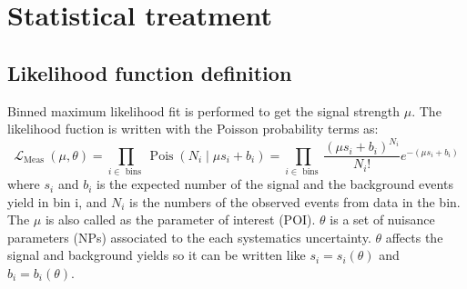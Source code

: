 \chapter{Statistical treatment}

\section{Likelihood function definition}
Binned maximum likelihood fit is performed to get the signal strength $\mu$. The likelihood fuction is written with the Poisson probability terms as:
\begin{equation}
\mathcal{L}_{\text {Meas }}(\mu, \theta)=\prod_{i \in \text { bins }} \operatorname{Pois}\left(N_{i} \mid \mu s_{i}+b_{i}\right)=\prod_{i \in \text { bins }} \frac{\left(\mu s_{i}+b_{i}\right)^{N_{i}}}{N_{i} !} e^{-\left(\mu s_{i}+b_{i}\right)}
\end{equation}
where $s_i$ and $b_i$ is the expected number of the signal and the background events yield in bin i, and $N_i$ is the numbers of the observed events from data in the bin. The $\mu$ is also called as the parameter of interest (POI). $\theta$ is a set of nuisance parameters (NPs) associated to the each systematics uncertainty. $\theta$ affects the signal and background yields so it can be written like $s_{i}=s_{i}(\theta)$ and $b_{i}=b_{i}(\theta)$. 

